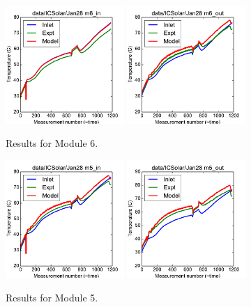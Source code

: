 \documentclass{article}
\begin{document}
\begin{figure}[!ht]
\centering
\includegraphics[width=0.4\textwidth]{../../data/ICSolar/images/Jan28_m6_in.pdf}\hspace{0.05\textwidth}
\includegraphics[width=0.4\textwidth]{../../data/ICSolar/images/Jan28_m6_out.pdf}\hspace{0.05\textwidth}\\
\caption{Results for Module 6.}\end{figure}
\begin{figure}[!ht]
\centering
\includegraphics[width=0.4\textwidth]{../../data/ICSolar/images/Jan28_m5_in.pdf}\hspace{0.05\textwidth}
\includegraphics[width=0.4\textwidth]{../../data/ICSolar/images/Jan28_m5_out.pdf}\hspace{0.05\textwidth}\\
\caption{Results for Module 5.}\end{figure}
\end{document}
